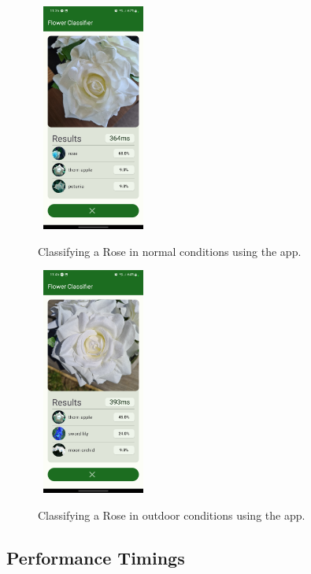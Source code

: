 \documentclass[12pt,a4paper]{report}
\begin{document}
\begin{figure}[h]\
    \includegraphics[width=0.3\textwidth]{rose_light_2.jpg}
    \caption{Classifying a Rose in normal conditions using the app.}
    \label{fig:rose_med}
\end{figure}

\begin{figure}[h]\
    \includegraphics[width=0.3\textwidth]{rose_light_3.jpg}
    \caption{Classifying a Rose in outdoor conditions using the app.}
    \label{fig:rose_light}
\end{figure}

\clearpage

\subsection{Performance Timings}

\label{subsec:perf_timings}
\end{document}

